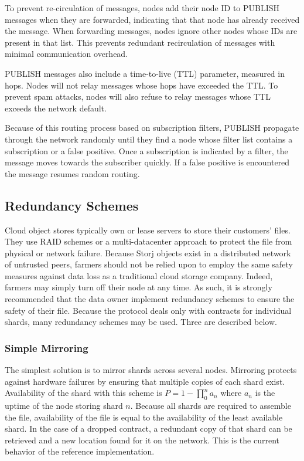 \documentclass[a4paper,10pt]{article}
\begin{document}
To prevent re-circulation of messages, nodes add their node ID to PUBLISH messages when they are forwarded, indicating that that node has already received the message. When forwarding messages, nodes ignore other nodes whose IDs are present in that list. This prevents redundant recirculation of messages with minimal communication overhead.

PUBLISH messages also include a time-to-live (TTL) parameter, measured in hops. Nodes will not relay messages whose hops have exceeded the TTL. To prevent spam attacks, nodes will also refuse to relay messages whose TTL exceeds the network default.

Because of this routing process based on subscription filters, PUBLISH propagate through the network randomly until they find a node whose filter list contains a subscription or a false positive. Once a subscription is indicated by a filter, the message moves towards the subscriber quickly. If a false positive is encountered the message resumes random routing.

\subsection{Redundancy Schemes}
Cloud object stores typically own or lease servers to store their customers’ files. They use RAID schemes or a multi-datacenter approach to protect the file from physical or network failure. Because Storj objects exist in a distributed network of untrusted peers, farmers should not be relied upon to employ the same safety measures against data loss as a traditional cloud storage company. Indeed, farmers may simply turn off their node at any time. As such, it is strongly recommended that the data owner implement redundancy schemes to ensure the safety of their file. Because the protocol deals only with contracts for individual shards, many redundancy schemes may be used. Three are described below.

\subsubsection{Simple Mirroring}
The simplest solution is to mirror shards across several nodes. Mirroring protects against hardware failures by ensuring that multiple copies of each shard exist. Availability of the shard with this scheme is $ P = 1 - \prod_{0}^{n} a_{n} $ where $ a_{n} $ is the uptime of the node storing shard $ n $. Because all shards are required to assemble the file, availability of the file is equal to the availability of the least available shard. In the case of a dropped contract, a redundant copy of that shard can be retrieved and a new location found for it on the network. This is the current behavior of the reference implementation.
\end{document}
